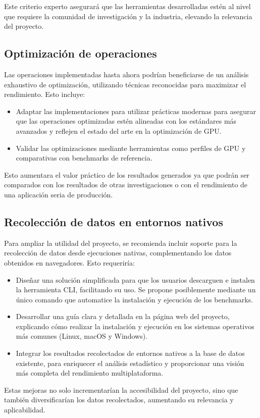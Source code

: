 \documentclass[conference]{IEEEtran}
\begin{document}
Este criterio experto asegurará que las herramientas desarrolladas estén al nivel
que requiere la comunidad de investigación y la industria, elevando la relevancia
del proyecto.

\subsection{Optimización de operaciones}

Las operaciones implementadas hasta ahora podrían beneficiarse de un análisis
exhaustivo de optimización, utilizando técnicas reconocidas para maximizar el
rendimiento. Esto incluye:

\begin{itemize}
    \item Adaptar las implementaciones para utilizar prácticas modernas para
      asegurar que las operaciones optimizadas estén alineadas con los estándares
      más avanzados y reflejen el estado del arte en la optimización de GPU.
    \item Validar las optimizaciones mediante herramientas como perfiles de GPU
      y comparativas con benchmarks de referencia.
\end{itemize}

Esto aumentara el valor práctico de los resultados generados ya que podrán ser
comparados con los resultados de otras investigaciones o con el rendimiento
de una aplicación seria de producción.

\subsection{Recolección de datos en entornos nativos}

Para ampliar la utilidad del proyecto, se recomienda incluir soporte para la
recolección de datos desde ejecuciones nativas, complementando los datos
obtenidos en navegadores. Esto requeriría:

\begin{itemize}
    \item Diseñar una solución simplificada para que los usuarios descarguen e
      instalen la herramienta CLI, facilitando su uso. Se propone posiblemente
      mediante un único comando que automatice la instalación y ejecución de
      los benchmarks.
    \item Desarrollar una guía clara y detallada en la página web del proyecto,
      explicando cómo realizar la instalación y ejecución en los sistemas
      operativos más comunes (Linux, macOS y Windows).
    \item Integrar los resultados recolectados de entornos nativos a la base de
      datos existente, para enriquecer el análisis estadístico y proporcionar
      una visión más completa del rendimiento multiplataforma.
\end{itemize}

Estas mejoras no solo incrementarían la accesibilidad del proyecto, sino que
también diversificarían los datos recolectados, aumentando su relevancia y
aplicabilidad.

\nocite{*}
\printbibliography
\end{document}
